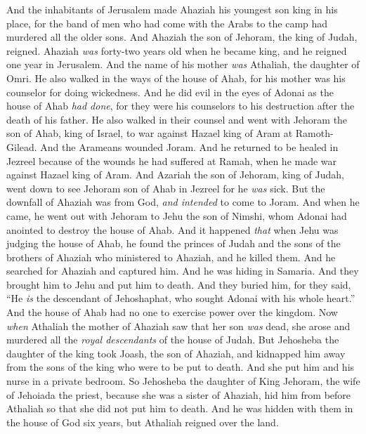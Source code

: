 \begin{biblechapter} %
 And the inhabitants of Jerusalem made Ahaziah his youngest son king in his place, for the band of men who had come with the Arabs to the camp had murdered all the older sons. And Ahaziah the son of Jehoram, the king of Judah, reigned.
\verse Ahaziah \textit{was} forty-two years old when he became king, and he reigned one year in Jerusalem. And the name of his mother \textit{was} Athaliah, the daughter of Omri.
\verse He also walked in the ways of the house of Ahab, for his mother was his counselor for doing wickedness.
\verse And he did evil in the eyes of Adonai as the house of Ahab \textit{had done}, for they were his counselors to his destruction after the death of his father.
\verse He also walked in their counsel and went with Jehoram the son of Ahab, king of Israel, to war against Hazael king of Aram at Ramoth-Gilead. And the Arameans wounded Joram.
\verse And he returned to be healed in Jezreel because of the wounds he had suffered at Ramah, when he made war against Hazael king of Aram. And Azariah the son of Jehoram, king of Judah, went down to see Jehoram son of Ahab in Jezreel for he \textit{was} sick.
\verse But the downfall of Ahaziah was from God, \textit{and intended} to come to Joram. And when he came, he went out with Jehoram to Jehu the son of Nimshi, whom Adonai had anointed to destroy the house of Ahab.
\verse And it happened \textit{that} when Jehu was judging the house of Ahab, he found the princes of Judah and the sons of the brothers of Ahaziah who ministered to Ahaziah, and he killed them.
\verse And he searched for Ahaziah and captured him. And he was hiding in Samaria. And they brought him to Jehu and put him to death. And they buried him, for they said, “He \textit{is} the descendant of Jehoshaphat, who sought Adonai with his whole heart.” And the house of Ahab had no one to exercise power over the kingdom.
 Now \textit{when} Athaliah the mother of Ahaziah saw that her son \textit{was} dead, she arose and murdered all the \textit{royal descendants} of the house of Judah.
\verse But Jehosheba the daughter of the king took Joash, the son of Ahaziah, and kidnapped him away from the sons of the king who were to be put to death. And she put him and his nurse in a private bedroom. So Jehosheba the daughter of King Jehoram, the wife of Jehoiada the priest, because she was a sister of Ahaziah, hid him from before Athaliah so that she did not put him to death.
\verse And he was hidden with them in the house of God six years, but Athaliah reigned over the land.
\end{biblechapter}

